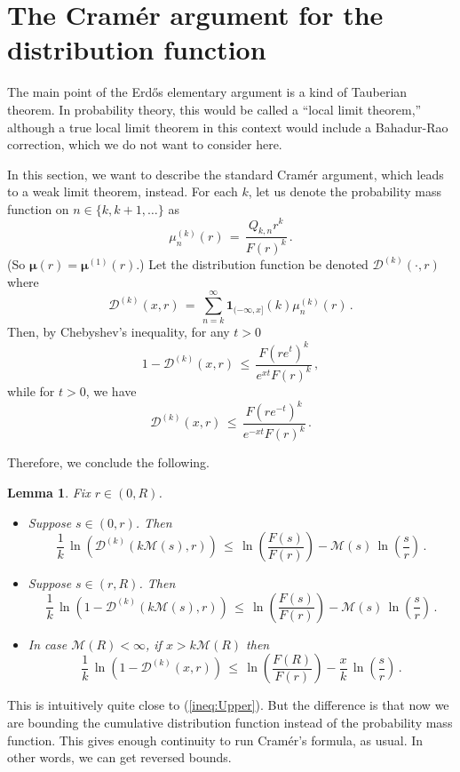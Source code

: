 \documentclass[12pt]{article}
\newtheorem{lemma}[thm]{Lemma}
\begin{document}
\appendix

\section{The Cram\'er argument for the distribution function}

The main point of the Erd\H{o}s elementary argument is a kind of Tauberian theorem.
In probability theory, this would be called a ``local limit theorem,'' although a true local limit theorem
in this context would include a Bahadur-Rao correction, which we do not want to consider here.

In this section, we want to describe the standard Cram\'er argument, which leads to a weak limit theorem, instead.
For each $k$, let us denote the probability mass function on $n \in \{k,k+1,\dots\}$ as 
$$
\mu_{n}^{(k)}(r)\, =\, \frac{Q_{k,n} r^k}{F(r)^k}\, .
$$
(So $\boldsymbol{\mu}(r) = \boldsymbol{\mu}^{(1)}(r)$.)
Let the distribution function be denoted $\mathcal{D}^{(k)}(\cdot,r)$ where
$$
\mathcal{D}^{(k)}(x,r)\, =\, \sum_{n=k}^{\infty} \mathbf{1}_{(-\infty,x]}(k) \mu_{n}^{(k)}(r)\, .
$$
Then, by Chebyshev's inequality, for any $t>0$
$$
1-\mathcal{D}^{(k)}(x,r)\, \leq\, \frac{F(re^t)^k}{e^{xt} F(r)^k}\, ,
$$
while for $t>0$, we have
$$
\mathcal{D}^{(k)}(x,r)\, \leq\, \frac{F(re^{-t})^k}{e^{-xt} F(r)^k}\, .
$$

Therefore, we conclude the following.
\begin{lemma}
Fix $r \in (0,R)$.
\begin{itemize}
\item
Suppose $s \in (0,r)$. Then
$$
\frac{1}{k}\, \ln\left(\mathcal{D}^{(k)}(k\mathcal{M}(s),r)\right)\, \leq\, \ln\left(\frac{F(s)}{F(r)}\right) - \mathcal{M}(s)\, \ln\left(\frac{s}{r}\right)\, .
$$
\item
Suppose $s \in (r,R)$. Then
$$
\frac{1}{k}\, \ln\left(1-\mathcal{D}^{(k)}(k\mathcal{M}(s),r)\right)\, \leq\, \ln\left(\frac{F(s)}{F(r)}\right) - \mathcal{M}(s)\, \ln\left(\frac{s}{r}\right)\, .
$$
\item In case $\mathcal{M}(R)<\infty$, if $x>k \mathcal{M}(R) $ then
$$
\frac{1}{k}\, \ln\left(1-\mathcal{D}^{(k)}(x,r)\right)\, \leq\, \ln\left(\frac{F(R)}{F(r)}\right) - \frac{x}{k}\, \ln\left(\frac{s}{r}\right)\, .
$$
\end{itemize}
\end{lemma}

This is intuitively quite close to (\ref{ineq:Upper}).
But the difference is that now we are bounding the cumulative distribution function instead of the probability mass function.
This gives enough continuity to run Cram\'er's formula, as usual.
In other words, we can get reversed bounds.
\end{document}
